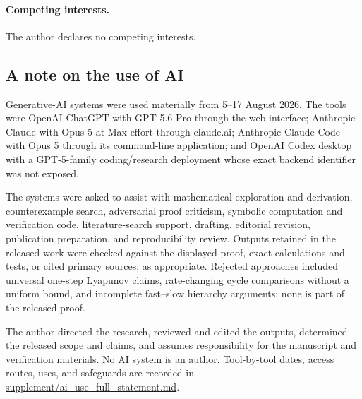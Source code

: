 \paragraph{Competing interests.}
The author declares no competing interests.

\subsection*{A note on the use of AI}
Generative-AI systems were used materially from 5--17 August 2026.  The tools
were OpenAI ChatGPT with GPT-5.6 Pro through the web interface; Anthropic
Claude with Opus 5 at Max effort through claude.ai; Anthropic Claude Code with
Opus 5 through its command-line application; and OpenAI Codex desktop with a
GPT-5-family coding/research deployment whose exact backend identifier was not
exposed.

The systems were asked to assist with mathematical exploration and derivation,
counterexample search, adversarial proof criticism, symbolic computation and
verification code, literature-search support, drafting, editorial revision,
publication preparation, and reproducibility review.  Outputs retained in the
released work were checked against the displayed proof, exact calculations and
tests, or cited primary sources, as appropriate.  Rejected approaches included universal
one-step Lyapunov claims, rate-changing cycle comparisons without a uniform
bound, and incomplete fast--slow hierarchy arguments; none is part of the
released proof.

The author directed the research, reviewed and edited the outputs, determined
the released scope and claims, and assumes responsibility for the manuscript
and verification materials.  No AI system is an author.  Tool-by-tool dates,
access routes, uses, and safeguards are recorded in
\href{https://github.com/AlecKriebel/Math/blob/bimolecular-positive-recurrence-v1.2.3/bimolecular_positive_recurrence_submission_v1_2_3/supplement/ai_use_full_statement.md}{supplement/ai\_use\_full\_statement.md}.



